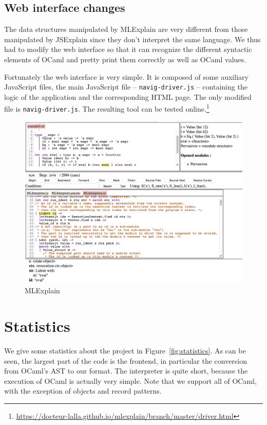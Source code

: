 \documentclass[twocolumn,a4paper]{article}
\begin{document}
\subsection{Web interface changes}

The data structures manipulated by MLExplain are very different from those
manipulated by JSExplain since they don't interpret the same language. We thus
had to modify the web interface so that it can recognize the different syntactic
elements of OCaml and pretty print them correctly as well as OCaml values.

Fortunately the web interface is very simple. It is composed of some auxiliary
JavaScript files, the main JavaScript file -- \texttt{navig-driver.js} --
containing the logic of the application and the corresponding HTML page. The
only modified file is \texttt{navig-driver.js}. The resulting tool can be tested
online.\footnote{\url{https://docteur-lalla.github.io/mlexplain/branch/master/driver.html}}

\begin{figure}
  \centering
  \includegraphics[width=14cm]{mlexplain.png}
  \caption{MLExplain}
  \label{fig:mlexplain}
\end{figure}

\section{Statistics}

We give some statistics about the project in Figure~\ref{fig:statistics}. As can
be seen, the largest part of the code is the frontend, in particular the
conversion from OCaml's AST to our format. The interpreter is quite short,
because the execution of OCaml is actually very simple. Note that we support all
of OCaml, with the exception of objects and record patterns.
\end{document}
